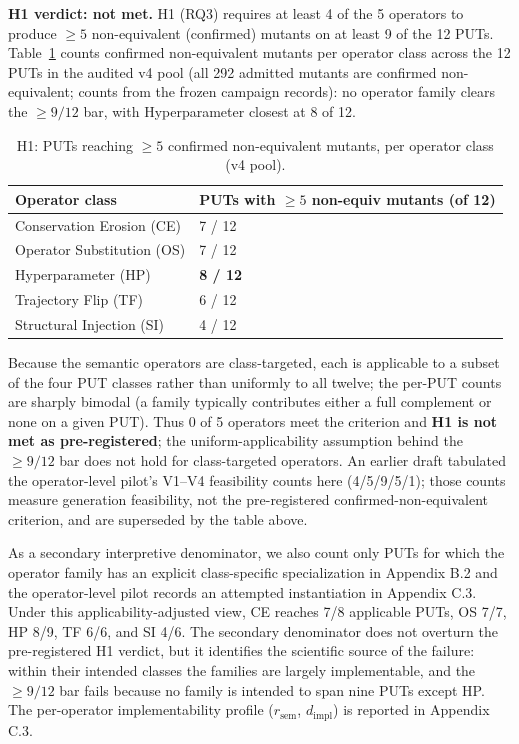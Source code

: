 \documentclass[manuscript,screen,review]{acmart}
\begin{document}
\textbf{H1 verdict: not met.} H1 (RQ3) requires at least 4 of the 5
operators to produce $\geq 5$ non-equivalent (confirmed) mutants on at
least 9 of the 12 PUTs. Table~\ref{tab:p2-32} counts confirmed
non-equivalent mutants per operator class across the 12 PUTs in the
audited v4 pool (all 292 admitted mutants are confirmed non-equivalent;
counts from the frozen campaign records): no
operator family clears the $\geq 9/12$ bar, with Hyperparameter closest
at 8 of 12.

{%
\begin{longtable}[]{@{}ll@{}}
\caption{H1: PUTs reaching $\geq 5$ confirmed non-equivalent mutants,
per operator class (v4 pool).}\label{tab:p2-32}\\
\toprule\noalign{}
Operator class & PUTs with $\geq 5$ non-equiv mutants (of 12) \\
\midrule\noalign{}
\endfirsthead
\endhead
\bottomrule\noalign{}
\endlastfoot
Conservation Erosion (CE) & 7 / 12 \\
Operator Substitution (OS) & 7 / 12 \\
Hyperparameter (HP) & \textbf{8 / 12} \\
Trajectory Flip (TF) & 6 / 12 \\
Structural Injection (SI) & 4 / 12 \\
\end{longtable}
}

Because the semantic operators are class-targeted, each is applicable
to a subset of the four PUT classes rather than uniformly to all twelve;
the per-PUT counts are sharply bimodal (a family typically contributes
either a full complement or none on a given PUT). Thus 0 of 5 operators
meet the criterion and \textbf{H1 is
not met as pre-registered}; the uniform-applicability assumption behind
the $\geq 9/12$ bar does not hold for class-targeted operators. An
earlier draft tabulated the operator-level pilot's V1--V4 feasibility
counts here (4/5/9/5/1); those counts measure generation feasibility,
not the pre-registered confirmed-non-equivalent criterion, and are
superseded by the table above.

As a secondary interpretive denominator, we also count only PUTs for
which the operator family has an explicit class-specific specialization
in Appendix B.2 and the operator-level pilot records an attempted
instantiation in Appendix C.3. Under this applicability-adjusted view,
CE reaches 7/8 applicable PUTs, OS 7/7, HP 8/9, TF 6/6, and SI 4/6. The
secondary denominator does not overturn the pre-registered H1 verdict,
but it identifies the scientific source of the failure: within their
intended classes the families are largely implementable, and the
$\geq 9/12$ bar fails because no family is intended to span nine PUTs
except HP. The per-operator implementability profile ($r_{\mathrm{sem}}$,
$d_{\mathrm{impl}}$) is reported in Appendix C.3.
\end{document}
